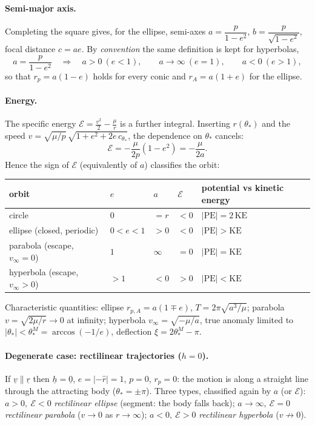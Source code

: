 \paragraph{Semi-major axis.} Completing the square gives, for the ellipse, semi-axes $a=\dfrac{p}{1-e^2}$,
$b=\dfrac{p}{\sqrt{1-e^2}}$, focal distance $c=ae$. By \emph{convention} the same definition is kept for hyperbolas,
\begin{equation}
a=\frac{p}{1-e^{2}}\quad\Rightarrow\quad a>0\ (e<1),\qquad a\to\infty\ (e=1),\qquad a<0\ (e>1),
\end{equation}
so that $r_p=a(1-e)$ holds for every conic and $r_A=a(1+e)$ for the ellipse.

\paragraph{Energy.} The specific energy $\mathcal E=\frac{v^2}{2}-\frac{\mu}{r}$ is a further integral. Inserting $r(\theta_*)$ and
the speed $v=\sqrt{\mu/p}\,\sqrt{1+e^2+2e\,c_{\theta_*}}$, the dependence on $\theta_*$ cancels:
\begin{equation}
\mathcal E=-\frac{\mu}{2p}\left(1-e^{2}\right)=-\frac{\mu}{2a}.
\end{equation}
Hence the sign of $\mathcal E$ (equivalently of $a$) classifies the orbit:
\begin{center}
\small
\begin{tabular}{@{}lllll@{}}
\toprule
orbit & $e$ & $a$ & $\mathcal E$ & potential vs kinetic energy\\
\midrule
circle & $0$ & $=r$ & $<0$ & $|\mathrm{PE}|=2\,\mathrm{KE}$\\
ellipse (closed, periodic) & $0<e<1$ & $>0$ & $<0$ & $|\mathrm{PE}|>\mathrm{KE}$\\
parabola (escape, $v_\infty=0$) & $1$ & $\infty$ & $=0$ & $|\mathrm{PE}|=\mathrm{KE}$\\
hyperbola (escape, $v_\infty>0$) & $>1$ & $<0$ & $>0$ & $|\mathrm{PE}|<\mathrm{KE}$\\
\bottomrule
\end{tabular}
\end{center}
Characteristic quantities: ellipse $r_{p,A}=a(1\mp e)$, $T=2\pi\sqrt{a^3/\mu}$; parabola $v=\sqrt{2\mu/r}\to0$ at infinity;
hyperbola $v_\infty=\sqrt{-\mu/a}$, true anomaly limited to $|\theta_*|<\theta_*^M=\arccos(-1/e)$, deflection
$\xi=2\theta_*^M-\pi$.

\paragraph{Degenerate case: rectilinear trajectories ($h=0$).} If $\underline v\parallel\underline r$ then $\underline h=\underline 0$,
$e=|-\hat r|=1$, $p=0$, $r_p=0$: the motion is along a straight line through the attracting body ($\theta_*=\pm\pi$). Three
types, classified again by $a$ (or $\mathcal E$):
$a>0,\ \mathcal E<0$ \emph{rectilinear ellipse} (segment: the body falls back);
$a\to\infty,\ \mathcal E=0$ \emph{rectilinear parabola} ($v\to0$ as $r\to\infty$);
$a<0,\ \mathcal E>0$ \emph{rectilinear hyperbola} ($v\not\to0$).

